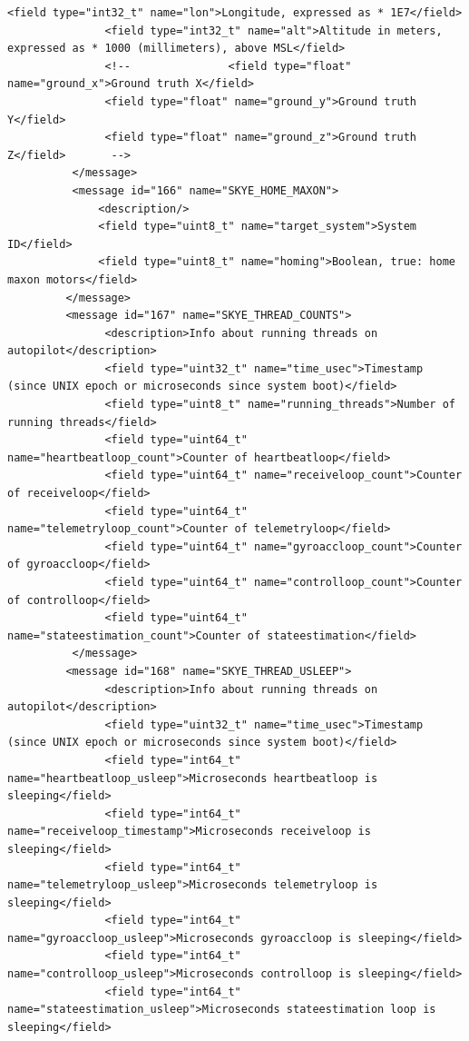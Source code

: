 \begin{lstlisting}[captionpos=b, caption="Definition of \textsc{Skye} specific Mavlink messages", label=app_xml]
               <field type="int32_t" name="lon">Longitude, expressed as * 1E7</field>
               <field type="int32_t" name="alt">Altitude in meters, expressed as * 1000 (millimeters), above MSL</field>
               <!--               <field type="float" name="ground_x">Ground truth X</field>			
               <field type="float" name="ground_y">Ground truth Y</field>
               <field type="float" name="ground_z">Ground truth Z</field>		-->
          </message>
          <message id="166" name="SKYE_HOME_MAXON">
              <description/>
              <field type="uint8_t" name="target_system">System ID</field>
              <field type="uint8_t" name="homing">Boolean, true: home maxon motors</field>
         </message>
         <message id="167" name="SKYE_THREAD_COUNTS">
               <description>Info about running threads on autopilot</description>
               <field type="uint32_t" name="time_usec">Timestamp (since UNIX epoch or microseconds since system boot)</field>
               <field type="uint8_t" name="running_threads">Number of running threads</field>
               <field type="uint64_t" name="heartbeatloop_count">Counter of heartbeatloop</field>
               <field type="uint64_t" name="receiveloop_count">Counter of receiveloop</field>
               <field type="uint64_t" name="telemetryloop_count">Counter of telemetryloop</field>
               <field type="uint64_t" name="gyroaccloop_count">Counter of gyroaccloop</field>
               <field type="uint64_t" name="controlloop_count">Counter of controlloop</field>
               <field type="uint64_t" name="stateestimation_count">Counter of stateestimation</field>
          </message>
         <message id="168" name="SKYE_THREAD_USLEEP">
               <description>Info about running threads on autopilot</description>
               <field type="uint32_t" name="time_usec">Timestamp (since UNIX epoch or microseconds since system boot)</field>
               <field type="int64_t" name="heartbeatloop_usleep">Microseconds heartbeatloop is sleeping</field>
               <field type="int64_t" name="receiveloop_timestamp">Microseconds receiveloop is sleeping</field>
               <field type="int64_t" name="telemetryloop_usleep">Microseconds telemetryloop is sleeping</field>
               <field type="int64_t" name="gyroaccloop_usleep">Microseconds gyroaccloop is sleeping</field>
               <field type="int64_t" name="controlloop_usleep">Microseconds controlloop is sleeping</field>
               <field type="int64_t" name="stateestimation_usleep">Microseconds stateestimation loop is sleeping</field>

\end{lstlisting}
